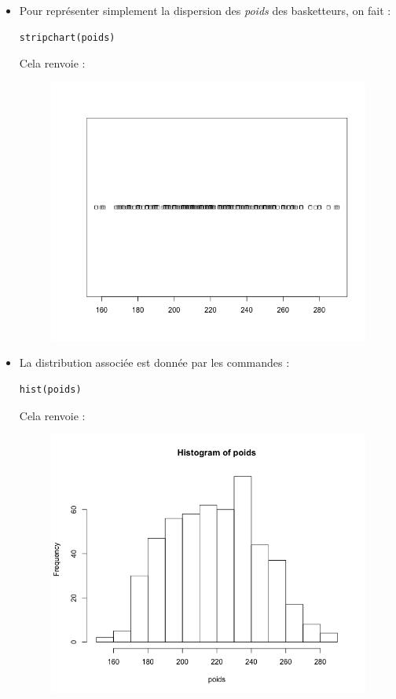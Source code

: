 \begin{enumerate}
\begin{itemize}
\item Pour représenter simplement la dispersion des \textit{poids} des basketteurs, on fait :
\begin{lstlisting}[language=html]
stripchart(poids)
\end{lstlisting}
Cela renvoie :
\begin{figure}[H]\begin{center}\includegraphics[scale=0.4]{ilu/gra81.png}\end{center}\end{figure}
\item La distribution associée est donnée par les commandes :
\begin{lstlisting}[language=html]
hist(poids)
\end{lstlisting}
Cela renvoie :
\begin{figure}[H]\begin{center}\includegraphics[scale=0.4]{ilu/gra82.png}\end{center}\end{figure}

\end{itemize}
\end{enumerate}
